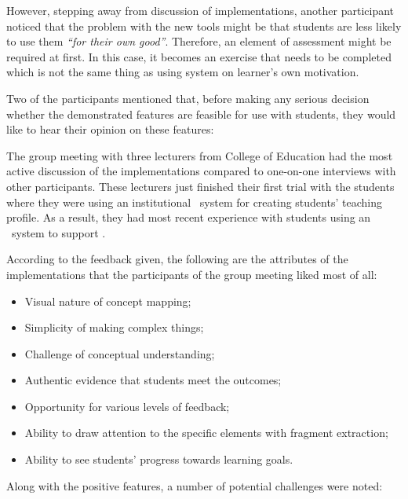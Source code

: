 However, stepping away from discussion of implementations, another participant
noticed that the problem with the new tools might be that students are less
likely to use them \textit{``for their own good''}. Therefore, an element of
assessment might be required at first. In this case, it becomes an exercise that
needs to be completed which is not the same thing as using system on learner's
own motivation.

Two of the participants mentioned that, before making any serious decision
whether the demonstrated features are feasible for use with students, they would
like to hear their opinion on these features:


The group meeting with three lecturers from College of Education had the most
active discussion of the implementations compared to one-on-one interviews
with other participants. These lecturers just finished their first trial with
the students where they were using an institutional \ep~system for creating
students' teaching profile. As a result, they had most recent experience with
students using an \ep~system to support \LLLsn.

According to the feedback given, the following are the attributes of the
implementations that the participants of the group meeting liked most of all:

\begin{itemize}
  \item Visual nature of concept mapping;
  \item Simplicity of making complex things;
  \item Challenge of conceptual understanding;
  \item Authentic evidence that students meet the outcomes;
  \item Opportunity for various levels of feedback;
  \item Ability to draw attention to the specific elements with fragment
  extraction;
  \item Ability to see students' progress towards learning goals.
\end{itemize}

Along with the positive features, a number of potential challenges were noted:

